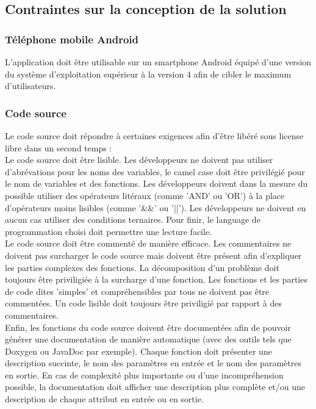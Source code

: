 \subsection{Contraintes sur la conception de la solution} %
\label{sub:contraintes_sur_la_conception_de_la_solution}

	\subsubsection{Téléphone mobile Android}
	L'application doit être utilisable sur un smartphone Android équipé d'une version du système d'exploitation supérieur à la version 4 afin de cibler le maximum d'utilisateurs.

	\subsubsection{Code source}
	Le code source doit répondre à certaines exigences afin d'être libéré sous license libre dans un second temps :\\

	Le code source doit être lisible. Les développeurs ne doivent pas utiliser d'abrévations pour les noms des variables, le camel case doit être privilégié pour le nom de variables et des fonctions. Les développeurs doivent dans la mesure du possible utiliser des opérateurs litéraux (comme 'AND' ou 'OR') à la place d'opérateurs moins lisibles (comme '\&\&' ou '||'). Les développeurs ne doivent en aucun cas utiliser des conditions ternaires. Pour finir, le language de programmation choisi doit permettre une lecture facile.\\

	Le code source doit être commenté de manière efficace. Les commentaires ne doivent pas surcharger le code source mais doivent être présent afin d'expliquer les parties complexes des fonctions. La décomposition d'un problème doit toujours être priviligiée à la surcharge d'une fonction. Les fonctions et les parties de code dites 'simples' et compréhensibles par tous ne doivent pas être commentées. Un code lisible doit toujours être priviligié par rapport à des commentaires.\\

	Enfin, les fonctions du code source doivent être documentées afin de pouvoir générer une documentation de manière automatique (avec des outils tels que Doxygen ou JavaDoc par exemple). Chaque fonction doit présenter une description succinte, le nom des paramètres en entrée et le nom des paramètres en sortie. En cas de complexité plus importante ou d'une incompréhension possible, la documentation doit afficher une description plus complète et/ou une description de chaque attribut en entrée ou en sortie.


